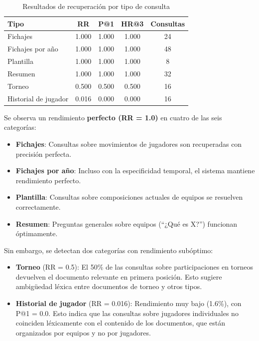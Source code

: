 \begin{table}[h]
\centering
\caption{Resultados de recuperación por tipo de consulta}
\label{tab:resultados_por_tipo}
\begin{tabular}{lcccc}
\hline
\textbf{Tipo} & \textbf{RR} & \textbf{P@1} & \textbf{HR@3} & \textbf{Consultas} \\ \hline
Fichajes & 1.000 & 1.000 & 1.000 & 24 \\
Fichajes por año & 1.000 & 1.000 & 1.000 & 48 \\
Plantilla & 1.000 & 1.000 & 1.000 & 8 \\
Resumen & 1.000 & 1.000 & 1.000 & 32 \\
Torneo & 0.500 & 0.500 & 0.500 & 16 \\
Historial de jugador & 0.016 & 0.000 & 0.000 & 16 \\ \hline
\end{tabular}
\end{table}

Se observa un rendimiento \textbf{perfecto (RR = 1.0)} en cuatro de las seis categorías:
\begin{itemize}
    \item \textbf{Fichajes}: Consultas sobre movimientos de jugadores son recuperadas con precisión perfecta.
    \item \textbf{Fichajes por año}: Incluso con la especificidad temporal, el sistema mantiene rendimiento perfecto.
    \item \textbf{Plantilla}: Consultas sobre composiciones actuales de equipos se resuelven correctamente.
    \item \textbf{Resumen}: Preguntas generales sobre equipos (``¿Qué es X?'') funcionan óptimamente.
\end{itemize}

Sin embargo, se detectan dos categorías con rendimiento subóptimo:
\begin{itemize}
    \item \textbf{Torneo} (RR = 0.5): El 50\% de las consultas sobre participaciones en torneos devuelven el documento relevante en primera posición. Esto sugiere ambigüedad léxica entre documentos de torneo y otros tipos.
    \item \textbf{Historial de jugador} (RR = 0.016): Rendimiento muy bajo (1.6\%), con P@1 = 0.0. Esto indica que las consultas sobre jugadores individuales no coinciden léxicamente con el contenido de los documentos, que están organizados por equipos y no por jugadores.
\end{itemize}

